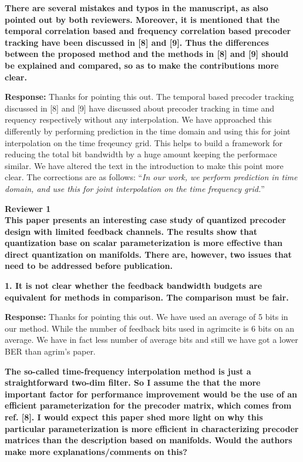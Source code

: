 \documentclass[12pt]{letter}
\begin{document}
\textbf{There are several mistakes and typos in the manuscript, as
  also pointed out by both reviewers. Moreover, it is mentioned that
  the temporal correlation based and frequency correlation based
  precoder tracking have been discussed in [8] and [9]. Thus the
  differences between the proposed method and the methods in [8] and
  [9] should be explained and compared, so as to make the
  contributions more clear.}

\textbf{Response:} Thanks for pointing this out. The temporal based precoder tracking discussed in [8] and [9]
have discussed about precoder tracking in time and requency respectively without any interpolation. 
We have approached this differently by performing prediction in the time domain and using this for joint interpolation 
on the time freqeuncy grid. This helps to build a framework for reducing the total bit bandwidth by a huge amount keeping the
performace similar.
We have altered the text in the introduction to make this point more clear. The corrections are as follows:
``\emph{In our work, we perform prediction in time domain, and use this for joint interpolation on the time frequency grid.}''

\textbf{Reviewer 1}\\

\textbf{This paper presents an interesting case study of quantized
  precoder design with limited feedback channels. The results show
  that quantization base on scalar parameterization is more effective
  than direct quantization on manifolds. There are, however, two
  issues that need to be addressed before publication.}

\textbf{1. It is not clear whether the feedback bandwidth budgets are
equivalent for methods in comparison. The comparison must be fair.}

\textbf{Response:}
Thanks for pointing this out. We have used an average of 5 bits in our method. While the number of feedback bits used in agrimcite is 6 bits on an average. We have in fact less number of average bits and still we have got a lower BER than agrim's paper.

\textbf{ The so-called time-frequency interpolation method is just a
  straightforward two-dim filter. So I assume the that the more
  important factor for performance improvement would be the use of an
  efficient parameterization for the precoder matrix, which comes from
  ref. [8]. I would expect this paper shed more light on why this
  particular parameterization is more efficient in characterizing
  precoder matrices than the description based on manifolds.  Would
  the authors make more explanations/comments on this?}
\end{document}
